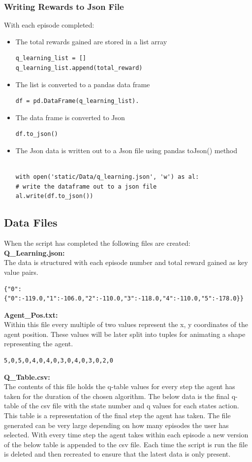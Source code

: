 \subsubsection{Writing Rewards to Json File}
With each episode completed: 
\begin{itemize}
	\item The total rewards gained are stored in a list array
\begin{verbatim}
q_learning_list = []
q_learning_list.append(total_reward)
\end{verbatim}

	\item The list is converted to a pandas data frame
\begin{verbatim}
df = pd.DataFrame(q_learning_list).
\end{verbatim}
	\item The data frame is converted to Json
\begin{verbatim}
df.to_json()
\end{verbatim}
	\item The Json data is written out to a Json file using pandas toJson() method
\begin{verbatim}

with open('static/Data/q_learning.json', 'w') as al:
# write the dataframe out to a json file
al.write(df.to_json())
\end{verbatim}
\end{itemize}
 
\subsection{Data Files}
When the script has completed the following files are created:\\
\textbf{Q\_Learning.json:}\\
The data is structured with each episode number and total reward gained as key value pairs.
\begin{verbatim}
{"0":{"0":-119.0,"1":-106.0,"2":-110.0,"3":-118.0,"4":-110.0,"5":-178.0}}
\end{verbatim}
\textbf{Agent\_Pos.txt:}\\
Within this file every multiple of two values represent the x, y coordinates of the agent position.
These values will be later split into tuples for animating a shape representing the agent.
\begin{verbatim}
5,0,5,0,4,0,4,0,3,0,4,0,3,0,2,0
\end{verbatim}
\textbf{Q\_Table.csv:}\\
The contents of this file holds the q-table values for every step the agent has taken for the duration of the chosen algorithm. The below data is the final q-table of the csv file with the state number and q values for each states action. This table is a representation of the final step the agent has taken. The file generated can be very large depending on how many episodes the user has selected. With every time step the agent takes within each episode a new version of the below table is appended to the csv file. Each time the script is run the file is deleted and then recreated to ensure that the latest data is only present.

